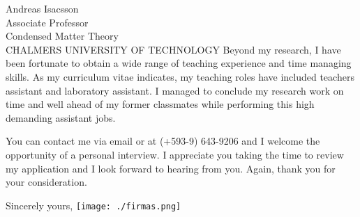\documentclass{letter}
\begin{document}
\begin{letter}{Andreas Isacsson\\
Associate Professor\\
Condensed Matter Theory\\
CHALMERS UNIVERSITY OF TECHNOLOGY}
Beyond my research, I have been fortunate to obtain a wide range
of teaching experience and time managing skills. As my curriculum
vitae indicates, my teaching roles have included teachers assistant
and laboratory assistant. I managed to conclude my research work
on time and well ahead of my former classmates while performing
this high demanding assistant jobs.

You can contact me via email or at (+593-9) 643-9206 and I welcome
the opportunity of a personal interview. I appreciate
you taking the time to review my application and I look forward to
hearing from you. Again, thank you for your consideration.

\closing{Sincerely yours,\vspace{0.5cm}
\texttt{[image: ./firmas.png]}
}

\end{letter}
\end{document}
